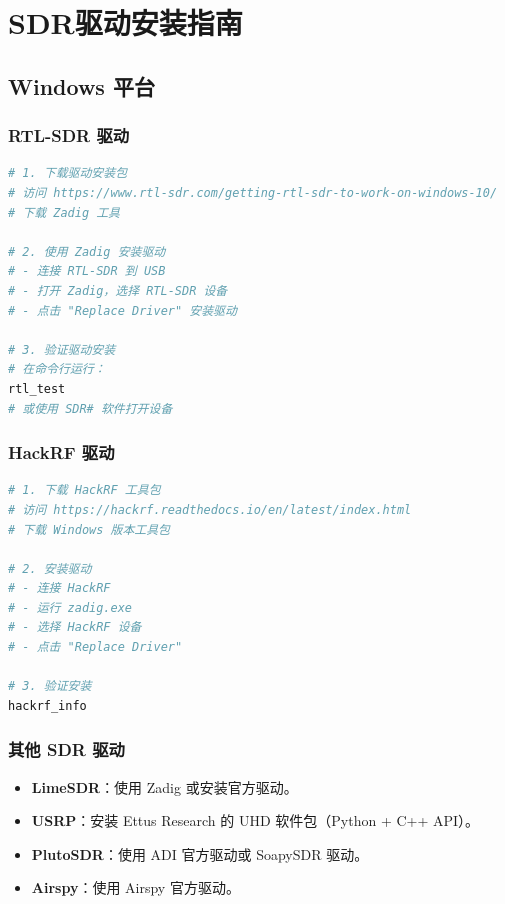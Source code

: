 \documentclass[12pt,UTF8]{ctexbook}
\begin{document}
\chapter{SDR驱动安装指南}
\label{app:sdr_drivers}

\section{Windows 平台}
\label{sec:driver_windows}

\subsection{RTL-SDR 驱动}
\begin{lstlisting}[language=Bash,caption={Windows 安装 RTL-SDR 驱动}]
# 1. 下载驱动安装包
# 访问 https://www.rtl-sdr.com/getting-rtl-sdr-to-work-on-windows-10/
# 下载 Zadig 工具

# 2. 使用 Zadig 安装驱动
# - 连接 RTL-SDR 到 USB
# - 打开 Zadig，选择 RTL-SDR 设备
# - 点击 "Replace Driver" 安装驱动

# 3. 验证驱动安装
# 在命令行运行：
rtl_test
# 或使用 SDR# 软件打开设备
\end{lstlisting}

\subsection{HackRF 驱动}
\begin{lstlisting}[language=Bash,caption={Windows 安装 HackRF 驱动}]
# 1. 下载 HackRF 工具包
# 访问 https://hackrf.readthedocs.io/en/latest/index.html
# 下载 Windows 版本工具包

# 2. 安装驱动
# - 连接 HackRF
# - 运行 zadig.exe
# - 选择 HackRF 设备
# - 点击 "Replace Driver"

# 3. 验证安装
hackrf_info
\end{lstlisting}

\subsection{其他 SDR 驱动}
\begin{itemize}[leftmargin=2cm]
    \item \textbf{LimeSDR}：使用 Zadig 或安装官方驱动。
    \item \textbf{USRP}：安装 Ettus Research 的 UHD 软件包（Python + C++ API）。
    \item \textbf{PlutoSDR}：使用 ADI 官方驱动或 SoapySDR 驱动。
    \item \textbf{Airspy}：使用 Airspy 官方驱动。
\end{itemize}
\end{document}
